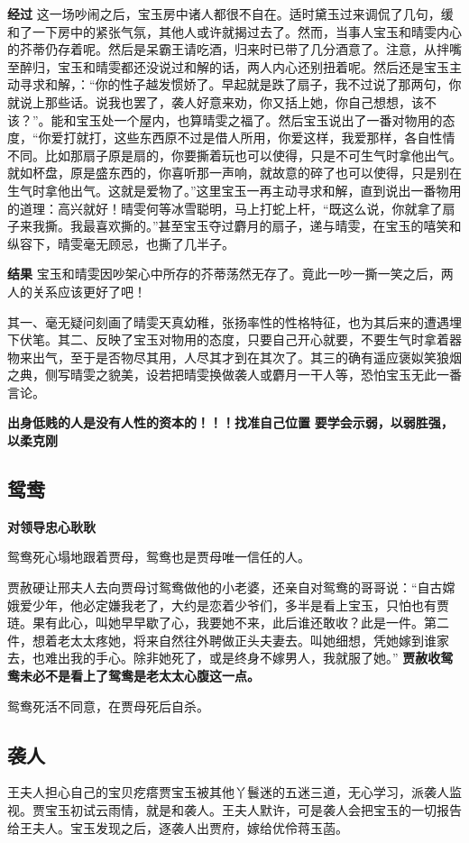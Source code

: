 \documentclass[conference]{IEEEtran}
\begin{document}
\begin{CJK*}{UTF8}{song}
\textbf{经过} 这一场吵闹之后，宝玉房中诸人都很不自在。适时黛玉过来调侃了几句，缓和了一下房中的紧张气氛，其他人或许就揭过去了。然而，当事人宝玉和晴雯内心的芥蒂仍存着呢。然后是呆霸王请吃酒，归来时已带了几分酒意了。注意，从拌嘴至醉归，宝玉和晴雯都还没说过和解的话，两人内心还别扭着呢。然后还是宝玉主动寻求和解，：“你的性子越发惯娇了。早起就是跌了扇子，我不过说了那两句，你就说上那些话。说我也罢了，袭人好意来劝，你又括上她，你自己想想，该不该？”。能和宝玉处一个屋内，也算晴雯之福了。然后宝玉说出了一番对物用的态度，“你爱打就打，这些东西原不过是借人所用，你爱这样，我爱那样，各自性情不同。比如那扇子原是扇的，你要撕着玩也可以使得，只是不可生气时拿他出气。就如杯盘，原是盛东西的，你喜听那一声响，就故意的碎了也可以使得，只是别在生气时拿他出气。这就是爱物了。”这里宝玉一再主动寻求和解，直到说出一番物用的道理：高兴就好！晴雯何等冰雪聪明，马上打蛇上杆，“既这么说，你就拿了扇子来我撕。我最喜欢撕的。”甚至宝玉夺过麝月的扇子，递与晴雯，在宝玉的嘻笑和纵容下，晴雯毫无顾忌，也撕了几半子。

\textbf{结果} 宝玉和晴雯因吵架心中所存的芥蒂荡然无存了。竟此一吵一撕一笑之后，两人的关系应该更好了吧！

其一、毫无疑问刻画了晴雯天真幼稚，张扬率性的性格特征，也为其后来的遭遇埋下伏笔。其二、反映了宝玉对物用的态度，只要自己开心就要，不要生气时拿着器物来出气，至于是否物尽其用，人尽其才到在其次了。其三的确有遥应褒姒笑狼烟之典，侧写晴雯之貌美，设若把晴雯换做袭人或麝月一干人等，恐怕宝玉无此一番言论。

\textbf{出身低贱的人是没有人性的资本的！！！找准自己位置}
\textbf{要学会示弱，以弱胜强，以柔克刚}

\subsection{鸳鸯}
\textbf{对领导忠心耿耿}

鸳鸯死心塌地跟着贾母，鸳鸯也是贾母唯一信任的人。

贾赦硬让邢夫人去向贾母讨鸳鸯做他的小老婆，还亲自对鸳鸯的哥哥说：“自古嫦娥爱少年，他必定嫌我老了，大约是恋着少爷们，多半是看上宝玉，只怕也有贾琏。果有此心，叫她早早歇了心，我要她不来，此后谁还敢收？此是一件。第二件，想着老太太疼她，将来自然往外聘做正头夫妻去。叫她细想，凭她嫁到谁家去，也难出我的手心。除非她死了，或是终身不嫁男人，我就服了她。”  \textbf{贾赦收鸳鸯未必不是看上了鸳鸯是老太太心腹这一点。}

鸳鸯死活不同意，在贾母死后自杀。

\subsection{袭人}
王夫人担心自己的宝贝疙瘩贾宝玉被其他丫鬟迷的五迷三道，无心学习，派袭人监视。贾宝玉初试云雨情，就是和袭人。王夫人默许，可是袭人会把宝玉的一切报告给王夫人。宝玉发现之后，逐袭人出贾府，嫁给优伶蒋玉菡。


\end{CJK*}
\end{document}
